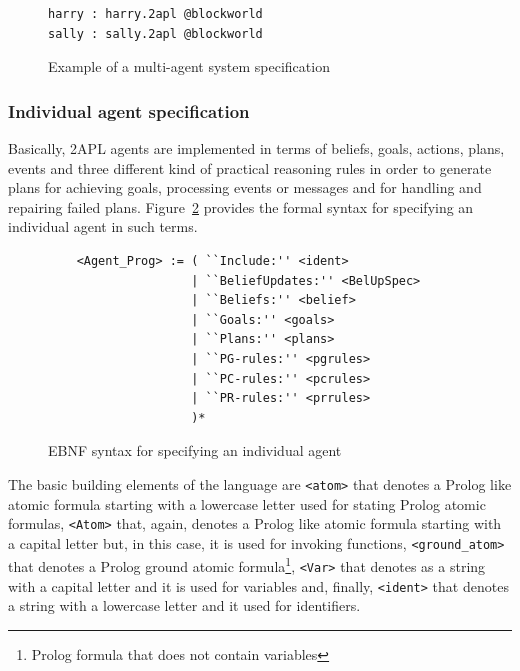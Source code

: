 \documentclass[a4paper]{article}
\begin{document}
\begin{figure}[htbp]
\begin{verbatim}
harry : harry.2apl @blockworld
sally : sally.2apl @blockworld
\end{verbatim}
\caption{Example of a multi-agent system specification}
\label{fig:ex_blockworld}
\end{figure}

\subsubsection{Individual agent specification} %

% 

Basically, 2APL agents are implemented in terms of beliefs, goals, actions, plans, events and three different kind of practical reasoning rules in order to generate plans for achieving goals, processing events or messages and for handling and repairing failed plans. Figure~\ref{fig:ebnf_agent} provides the formal syntax for specifying an individual agent in such terms.

\begin{figure}[htp]
\begin{verbatim}
	<Agent_Prog> := ( ``Include:'' <ident>
	                | ``BeliefUpdates:'' <BelUpSpec>
	                | ``Beliefs:'' <belief> 
	                | ``Goals:'' <goals> 
	                | ``Plans:'' <plans>
	                | ``PG-rules:'' <pgrules>
	                | ``PC-rules:'' <pcrules>
	                | ``PR-rules:'' <prrules>
	                )*
\end{verbatim}
\caption{EBNF syntax for specifying an individual agent}
\label{fig:ebnf_agent}
\end{figure}

The basic building elements of the language are \texttt{<atom>} that denotes a Prolog like atomic formula starting with a lowercase letter used for stating Prolog atomic formulas, \texttt{<Atom>} that, again, denotes a Prolog like atomic formula starting with a capital letter but, in this case, it is used for invoking functions, \texttt{<ground\_atom>} that denotes a Prolog ground atomic formula\footnote{Prolog formula that does not contain variables}, \texttt{<Var>} that denotes as a string with a capital letter and it is used for variables and, finally, \texttt{<ident>} that denotes a string with a lowercase letter and it used for identifiers.
\end{document}
